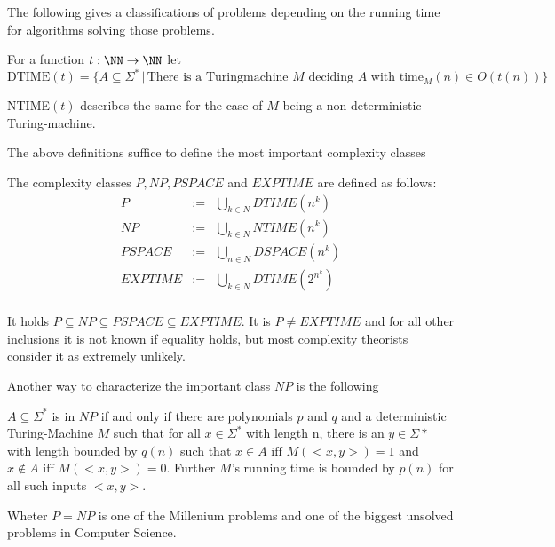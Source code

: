       The following gives a classifications of problems depending on the
      running time for algorithms solving those problems.
		\begin{definition}
			For a function $t: \NN \to \NN$ let 
      $$ \text{DTIME}(t) = \{ A \subseteq \Sigma^* \,|\, \text{There is a
      Turingmachine } M \text{ deciding } A \text{ with time}_M(n) \in O(t(n)) \} $$

      NTIME$(t)$ describes the same for the case of $M$ being a
      non-deterministic Turing-machine.
		\end{definition}
		The above definitions suffice to define the most important complexity classes
		\begin{definition}
			The complexity classes $P, NP, PSPACE$ and $EXPTIME$ are defined as follows:
			\begin{eqnarray*}
				P & := & \bigcup_{k \in N} DTIME(n^k) \\
				NP & := & \bigcup_{k \in N} NTIME(n^k) \\
				PSPACE & := & \bigcup_{n \in N} DSPACE(n^k) \\
				EXPTIME & := & \bigcup_{k \in N} DTIME(2^{n^k}) \\
			\end{eqnarray*}
		\end{definition}
		It holds $P \subseteq NP \subseteq PSPACE \subseteq EXPTIME$. 
		It is $P \neq EXPTIME$ and for all other inclusions it is not known if equality holds, but most 
		complexity theorists consider it as extremely unlikely.

    Another way to characterize the important class $NP$ is the following
    \begin{theorem}
      $A \subseteq \Sigma^*$ is in $NP$ if and only if there are polynomials
      $p$ and $q$ and a deterministic Turing-Machine $M$ such that for all $x
      \in \Sigma^*$ with length n, there is an $y \in \Sigma*$ with length
      bounded by $q(n)$ such that $x \in A \text{ iff } M(<x,y>) = 1$ and 
      $x \not \in A \text{ iff } M(<x,y>) = 0$. 
      Further $M$'s running time is bounded by $p(n)$ for all such inputs
      $<x,y>$.  
    \end{theorem}
		Wheter $P = NP$ is one of the Millenium problems and one of the biggest unsolved problems in Computer Science.

